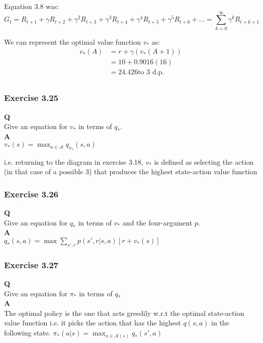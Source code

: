 Equation 3.8 was:
\begin{equation}
G_t = R_{t+1} + \gamma R_{t+2} + \gamma^2 R_{t+3} + \gamma^3 R_{t+4} + \gamma^4 R_{t+5} + \gamma^5 R_{t+6} + \ldots =  \sum_{k=0}^{\infty} \gamma^k R_{t+k+1}
\end{equation}

We can represent the optimal value function $v_*$ as:
\begin{align}
v_*(A) &= r + \gamma(v_*(A+1)) \\
 &= 10 + 0.9016(16) \\
 &= 24.426 \text{to 3 d.p.} \\
\end{align}

\subsubsection{Exercise 3.25}
\textbf{Q}\\
Give an equation for $v_*$ in terms of $q_*$.\\

\textbf{A}\\
$
v_*(s) = \max_{a \in \mathcal{A}} q_{\pi_*}(s,a)
$

i.e. returning to the diagram in exercise 3.18, $v_*$ is defined as selecting the action (in that case of a possible 3) that produces the highest state-action value function

\subsubsection{Exercise 3.26}
\textbf{Q}\\
Give an equation for $q_*$ in terms of $v_*$ and the four-argument $p$.\\

\textbf{A}\\
$
q_*(s,a) = \max \sum_{s', r} p(s', r | s, a)[r + v_*(s)]
$

\subsubsection{Exercise 3.27}
\textbf{Q}\\
Give an equation for $\pi_*$ in terms of $q_*$\\

\textbf{A}\\
The optimal policy is the one that acts greedily w.r.t the optimal state-action value function i.e. it picks the action that has the highest $q(s,a)$ in the following state.
$
\pi_*(a|s) = \max_{a \in \mathcal{A}(s)} q_*(s',a)
$


